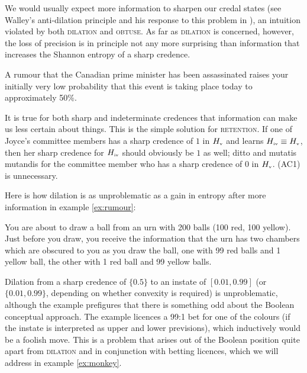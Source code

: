 \documentclass[11pt]{article}
\begin{document}
We would usually expect more information to sharpen our credal states
(see Walley's anti-dilation principle and his response to this problem
in ), an intuition violated by both
\textsc{dilation} and \textsc{obtuse}. As far as \textsc{dilation} is
concerned, however, the loss of precision is in principle not any more
surprising than information that increases the Shannon entropy of a
sharp credence.

\begin{quotex}
  \label{ex:rumour} A rumour that the Canadian prime
  minister has been assassinated raises your initially very low
  probability that this event is taking place today to approximately
  50\%.
\end{quotex}

It is true for both sharp and indeterminate credences that information
can make us less certain about things. This is the simple solution for
\textsc{retention}. If one of Joyce's committee members has a sharp
credence of $1$ in $H_{\mbox{\tiny{v}}}$ and learns
$H_{\mbox{\tiny{iv}}}\equiv{}H_{\mbox{\tiny{v}}}$, then her sharp
credence for $H_{\mbox{\tiny{iv}}}$ should obviously be $1$ as well;
ditto and mutatis mutandis for the committee member who has a sharp
credence of $0$ in $H_{\mbox{\tiny{v}}}$. (AC1) is unnecessary.

Here is how dilation is as unproblematic as a gain in entropy after
more information in example \ref{ex:rumour}:

\begin{quotex}
  \label{ex:urns} You are about to draw a ball
  from an urn with 200 balls (100 red, 100 yellow). Just before you
  draw, you receive the information that the urn has two chambers
  which are obscured to you as you draw the ball, one with 99 red
  balls and 1 yellow ball, the other with 1 red ball and 99 yellow
  balls.
\end{quotex}

Dilation from a sharp credence of $\{0.5\}$ to an instate of
$[0.01,0.99]$ (or $\{0.01,0.99\}$, depending on whether convexity is
required) is unproblematic, although the example prefigures that there
is something odd about the Boolean conceptual approach. The example
licences a 99:1 bet for one of the colours (if the instate is
interpreted as upper and lower previsions), which inductively would be
a foolish move. This is a problem that arises out of the Boolean
position quite apart from \textsc{dilation} and in conjunction with
betting licences, which we will address in example \ref{ex:monkey}.
\end{document}
